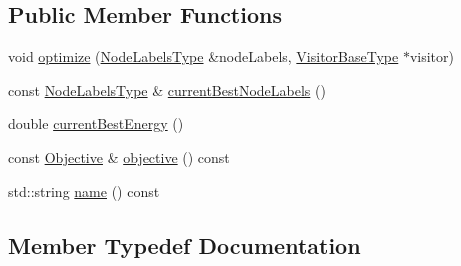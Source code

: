 \subsection*{Public Member Functions}
\begin{DoxyCompactItemize}
\item 
void \hyperlink{classnifty_1_1graph_1_1optimization_1_1lifted__multicut_1_1PyLiftedMulticutBase_af9dbf8c30f9373254f1f3b5c07162194}{optimize} (\hyperlink{classnifty_1_1graph_1_1optimization_1_1lifted__multicut_1_1PyLiftedMulticutBase_aff32f923ac202e928a33e375bf979497}{Node\+Labels\+Type} \&node\+Labels, \hyperlink{classnifty_1_1graph_1_1optimization_1_1lifted__multicut_1_1PyLiftedMulticutBase_ac8cdcdeb2751c508a445e4d1a66411f6}{Visitor\+Base\+Type} $\ast$visitor)
\item 
const \hyperlink{classnifty_1_1graph_1_1optimization_1_1lifted__multicut_1_1PyLiftedMulticutBase_aff32f923ac202e928a33e375bf979497}{Node\+Labels\+Type} \& \hyperlink{classnifty_1_1graph_1_1optimization_1_1lifted__multicut_1_1PyLiftedMulticutBase_a34f6885b9ab5e0b4718138766add6ffd}{current\+Best\+Node\+Labels} ()
\item 
double \hyperlink{classnifty_1_1graph_1_1optimization_1_1lifted__multicut_1_1PyLiftedMulticutBase_a2e6d5df55cdf660a0faeb42b00dfe613}{current\+Best\+Energy} ()
\item 
const \hyperlink{classnifty_1_1graph_1_1optimization_1_1lifted__multicut_1_1PyLiftedMulticutBase_aebb82b4b2afd6026d12565580f07fac3}{Objective} \& \hyperlink{classnifty_1_1graph_1_1optimization_1_1lifted__multicut_1_1PyLiftedMulticutBase_a1ed919cc5c16e3d28b26bec036c10c28}{objective} () const 
\item 
std\+::string \hyperlink{classnifty_1_1graph_1_1optimization_1_1lifted__multicut_1_1PyLiftedMulticutBase_aaa5dc7bebebe87db1aa61aefb272a3a4}{name} () const 
\end{DoxyCompactItemize}


\subsection{Member Typedef Documentation}
\hypertarget{classnifty_1_1graph_1_1optimization_1_1lifted__multicut_1_1PyLiftedMulticutBase_ac32a5f5a18cb3ade6b727c4e84791c46}{}
